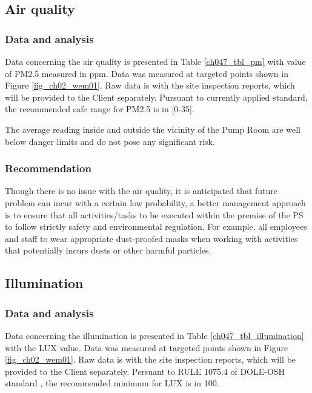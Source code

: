 \subsection{Air quality}\label{aq01}

\subsubsection{Data and analysis}
Data concerning the air quality is presented in Table \ref{ch047_tbl_pm} with value of PM2.5 measured in ppm. Data was measured at targeted points shown in Figure \ref{fig_ch02_wem01}. Raw data is with the site inspection reports, which will be provided to the Client separately. Pursuant to currently applied standard, the recommended safe range for PM2.5 is in [0-35].



The average reading inside and outside the vicinity of the Pump Room are well below danger limits and do not pose any significant risk.


\subsubsection{Recommendation}

Though there is no issue with the air quality, it is anticipated that future problem can incur with a certain low probability, a better management approach is to ensure that all activities/tasks to be executed within the premise of the PS to follow strictly safety and environmental regulation. For example, all employees and staff to wear appropriate dust-proofed masks when working with activities that potentially incurs dusts or other harmful particles.



\subsection{Illumination}\label{aq03}
\subsubsection{Data and analysis}
Data concerning the illumination is presented in Table \ref{ch047_tbl_illumination} with the LUX value. Data was measured at targeted points shown in Figure \ref{fig_ch02_wem01}. Raw data is with the site inspection reports, which will be provided to the Client separately. Persuant to RULE 1075.4 of DOLE-OSH standard \cite{DOLE2016}, the recommended minimum for LUX is in 100.

